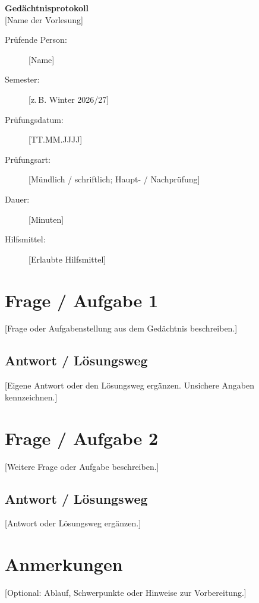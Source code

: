 \documentclass[11pt,a4paper]{article}
\begin{document}
\begin{center}
  {\Large\bfseries Gedächtnisprotokoll}\\[0.5em]
  {\large [Name der Vorlesung]}
\end{center}

\begin{description}
  \item[Prüfende Person:] [Name]
  \item[Semester:] [z.\,B. Winter 2026/27]
  \item[Prüfungsdatum:] [TT.MM.JJJJ]
  \item[Prüfungsart:] [Mündlich / schriftlich; Haupt- / Nachprüfung]
  \item[Dauer:] [Minuten]
  \item[Hilfsmittel:] [Erlaubte Hilfsmittel]
\end{description}

\section*{Frage / Aufgabe 1}
[Frage oder Aufgabenstellung aus dem Gedächtnis beschreiben.]

\subsection*{Antwort / Lösungsweg}
[Eigene Antwort oder den Lösungsweg ergänzen. Unsichere Angaben kennzeichnen.]

\section*{Frage / Aufgabe 2}
[Weitere Frage oder Aufgabe beschreiben.]

\subsection*{Antwort / Lösungsweg}
[Antwort oder Lösungsweg ergänzen.]

\section*{Anmerkungen}
[Optional: Ablauf, Schwerpunkte oder Hinweise zur Vorbereitung.]
\end{document}
